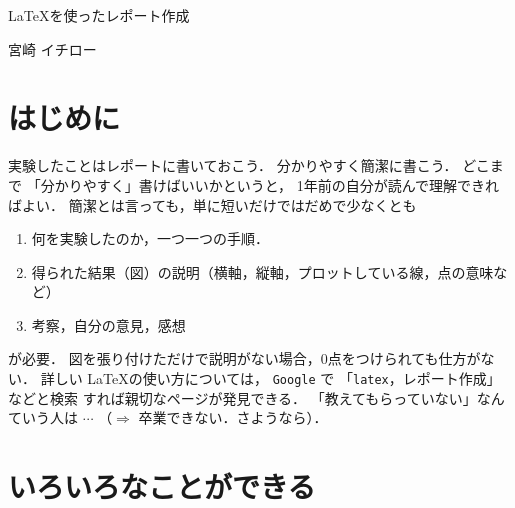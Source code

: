 \documentclass[a4paper,11pt,dvipdfmx]{jarticle}
\begin{document}


\centerline{\Large\gt \LaTeX を使ったレポート作成}      
\vskip 5mm
\centerline{\Large{} 宮崎 イチロー}


\section{はじめに} 
実験したことはレポートに書いておこう．
分かりやすく簡潔に書こう．
どこまで
「分かりやすく」書けばいいかというと，
1年前の自分が読んで理解できればよい．
簡潔とは言っても，単に短いだけではだめで少なくとも
\begin{enumerate}
\item 何を実験したのか，一つ一つの手順．
\item 得られた結果（図）の説明（横軸，縦軸，プロットしている線，点の意味など）
\item 考察，自分の意見，感想
\end{enumerate}
が必要．
図を張り付けただけで説明がない場合，0点をつけられても仕方がない．
%
%
詳しい \LaTeX の使い方については，
{\tt Google} で 「{\tt latex}，レポート作成」などと検索
すれば親切なページが発見できる．
「教えてもらっていない」なんていう人は $\cdots$
（$\Longrightarrow$ 卒業できない．さようなら）．


\section{いろいろなことができる}
\end{document}
